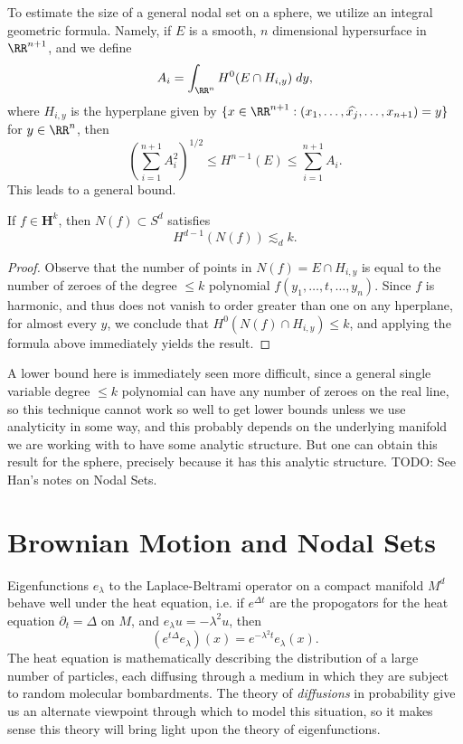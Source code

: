 To estimate the size of a general nodal set on a sphere, we utilize an integral geometric formula. Namely, if $E$ is a smooth, $n$ dimensional hypersurface in $\RR^{n+1}$, and we define
%
\[ A_i = \int_{\RR^n} H^0(E \cap H_{i,y})\; dy, \]
%
where $H_{i,y}$ is the hyperplane given by $\{ x \in \RR^{n+1}: (x_1,\dots,\widehat{x_j},\dots,x_{n+1}) = y \}$ for $y \in \RR^n$, then
%
\[ \left( \sum_{i = 1}^{n+1} A_i^2 \right)^{1/2} \leq H^{n-1}(E) \leq \sum_{i = 1}^{n+1} A_i. \]
%
This leads to a general bound.

\begin{theorem}
    If $f \in \mathbf{H}^k$, then $N(f) \subset S^d$ satisfies
    \[ H^{d-1}(N(f)) \lesssim_d k. \]
\end{theorem}
\begin{proof}
    Observe that the number of points in $N(f) = E \cap H_{i,y}$ is equal to the number of zeroes of the degree $\leq k$ polynomial $f(y_1,\dots,t,\dots,y_n)$. Since $f$ is harmonic, and thus does not vanish to order greater than one on any hperplane, for almost every $y$, we conclude that $H^0(N(f) \cap H_{i,y}) \leq k$, and applying the formula above immediately yields the result.
\end{proof}

\begin{remark}
    A lower bound here is immediately seen more difficult, since a general single variable degree $\leq k$ polynomial can have any number of zeroes on the real line, so this technique cannot work so well to get lower bounds unless we use analyticity in some way, and this probably depends on the underlying manifold we are working with to have some analytic structure. But one can obtain this result for the sphere, precisely because it has this analytic structure. TODO: See Han's notes on Nodal Sets.
\end{remark}

\section{Brownian Motion and Nodal Sets}

Eigenfunctions $e_\lambda$ to the Laplace-Beltrami operator on a compact manifold $M^d$ behave well under the heat equation, i.e. if $e^{\Delta t}$ are the propogators for the heat equation $\partial_t = \Delta$ on $M$, and $e_\lambda u = - \lambda^2 u$, then
%
\[ (e^{t \Delta} e_\lambda)(x) = e^{- \lambda^2 t} e_\lambda(x). \]
%
The heat equation is mathematically describing the distribution of a large number of particles, each diffusing through a medium in which they are subject to random molecular bombardments. The theory of \emph{diffusions} in probability give us an alternate viewpoint through which to model this situation, so it makes sense this theory will bring light upon the theory of eigenfunctions.

